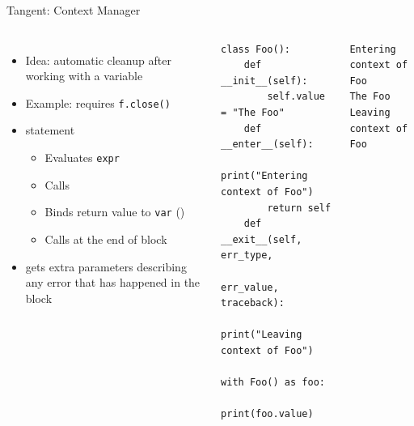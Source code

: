 \begin{frame}[fragile]{Tangent: Context Manager}
%
\begin{columns}[T]
\vspace{-6pt}
\begin{itemize}
\item Idea: automatic cleanup after working with a variable
\item Example:  requires \texttt{f.close()}
\item {} statement
	\begin{itemize}
	\item Evaluates \texttt{expr}
	\item Calls 
	\item Binds return value to \texttt{var} ()
	\item Calls  at the end of  block
	\end{itemize}
\item {} gets extra parameters describing any error that has happened in the  block
\end{itemize}
%
\vspace{-34pt}
\begin{codebox}
\begin{verbatim}
class Foo():
    def __init__(self):
        self.value = "The Foo"
    def __enter__(self):
        print("Entering context of Foo")
        return self
    def __exit__(self, err_type, 
                 err_value, traceback):
        print("Leaving context of Foo")

with Foo() as foo:
    print(foo.value)
\end{verbatim}
\end{codebox}
%
\begin{cmdbox}
\begin{verbatim}
Entering context of Foo
The Foo
Leaving context of Foo
\end{verbatim}
\end{cmdbox}
\end{columns}
%
\end{frame}


